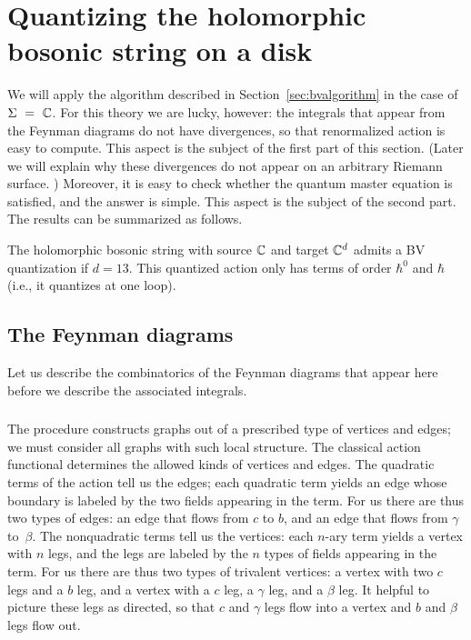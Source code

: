 \section{Quantizing the holomorphic bosonic string on a disk} 


We will apply the algorithm described in Section~\ref{sec:bvalgorithm}
in the case of $\Sigma~=~\mathbb C$.
For this theory we are lucky, however:
the integrals that appear from the Feynman diagrams do not have divergences,
so that renormalized action is easy to compute.
This aspect is the subject of the first part of this section.
(Later we will explain why these divergences do not appear on an arbitrary Riemann surface.
)
Moreover, it is easy to check whether the quantum master equation is satisfied,
and the answer is simple.
This aspect is the subject of the second part.
The results can be summarized as follows.

\begin{prop}
The holomorphic bosonic string with source $\mathbb C$ and target $\mathbb C^d$ admits a BV quantization
if $d = 13$.
This quantized action only has terms of order $\hbar^0$ and $\hbar$ (i.e., it quantizes at one loop).
\end{prop}

\subsection{The Feynman diagrams}

Let us describe the combinatorics of the Feynman diagrams that appear here
before we describe the associated integrals.

\subsubsection{}

The procedure constructs graphs out of a prescribed type of vertices and edges;
we must consider all graphs with such local structure.
The classical action functional determines the allowed kinds of vertices and edges.
The quadratic terms of the action tell us the edges;
each quadratic term yields an edge whose boundary is labeled by the two fields appearing in the term.
For us there are thus two types of edges: 
an edge that flows from $c$ to $b$, 
and an edge that flows from $\gamma$ to~$\beta$.
The nonquadratic terms tell us the vertices:
each $n$-ary term yields a vertex with $n$ legs,
and the legs are labeled by the $n$ types of fields appearing in the term.
For us there are thus two types of trivalent vertices:
a vertex with two $c$ legs and a $b$ leg, 
and a vertex with a $c$ leg, a $\gamma$ leg, and a $\beta$ leg.
It helpful to picture these legs as directed,
so that $c$ and $\gamma$ legs flow into a vertex
and $b$ and $\beta$ legs flow out.

